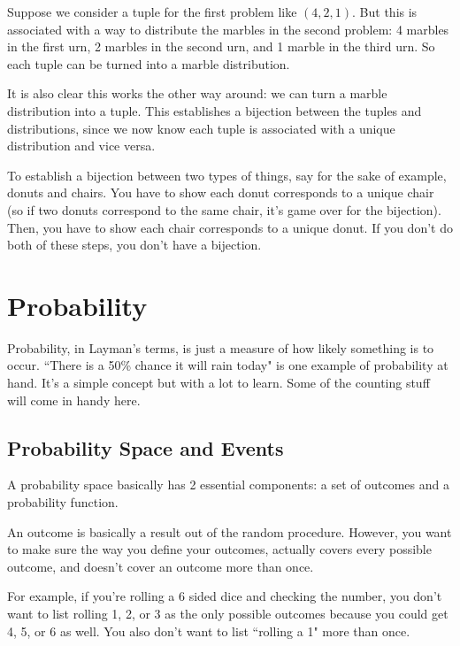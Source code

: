 \documentclass[11pt]{scrartcl}
\begin{document}
Suppose we consider a tuple for the first problem like $(4, 2, 1)$. But this is associated with a way to distribute the marbles in the second problem: 4 marbles in the first urn, 2 marbles in the second urn, and 1 marble in the third urn. So each tuple can be turned into a marble distribution.

It is also clear this works the other way around: we can turn a marble distribution into a tuple. This establishes a bijection between the tuples and distributions, since we now know each tuple is associated with a unique distribution and vice versa.

\begin{caveat}
    To establish a bijection between two types of things, say for the sake of example, donuts and chairs. You have to show each donut corresponds to a unique chair (so if two donuts correspond to the same chair, it's game over for the bijection). Then, you have to show each chair corresponds to a unique donut. If you don't do both of these steps, you don't have a bijection.
\end{caveat}

\section{Probability}

Probability, in Layman's terms, is just a measure of how likely something is to occur. ``There is a 50\% chance it will rain today" is one example of probability at hand. It's a simple concept but with a lot to learn. Some of the counting stuff will come in handy here.

\subsection{Probability Space and Events}

\begin{definition}
    A probability space basically has 2 essential components: a set of outcomes and a probability function.
\end{definition}

An outcome is basically a result out of the random procedure. However, you want to make sure the way you define your outcomes, actually covers every possible outcome, and doesn't cover an outcome more than once.

For example, if you're rolling a 6 sided dice and checking the number, you don't want to list rolling 1, 2, or 3 as the only possible outcomes because you could get 4, 5, or 6 as well. You also don't want to list ``rolling a 1" more than once.
\end{document}
